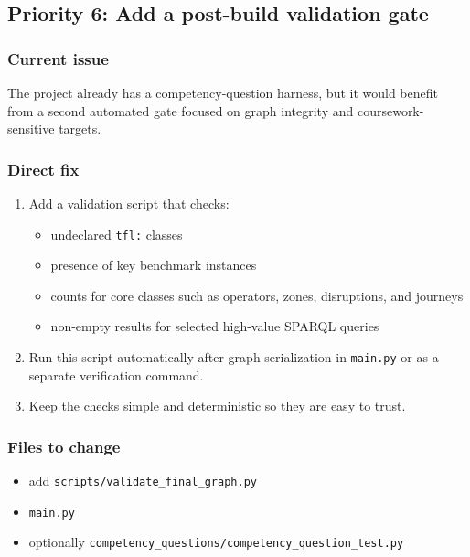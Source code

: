 \documentclass[
  11pt,
  a4paper,
]{article}
\providecommand{\tightlist}{%
  \setlength{\itemsep}{0pt}\setlength{\parskip}{0pt}}
\begin{document}
\subsection{Priority 6: Add a post-build validation
gate}\label{priority-6-add-a-post-build-validation-gate}

\subsubsection{Current issue}\label{current-issue-5}

The project already has a competency-question harness, but it would
benefit from a second automated gate focused on graph integrity and
coursework-sensitive targets.

\subsubsection{Direct fix}\label{direct-fix-5}

\begin{enumerate}
\def\labelenumi{\arabic{enumi}.}
\tightlist
\item
  Add a validation script that checks:

  \begin{itemize}
  \tightlist
  \item
    undeclared \texttt{tfl:} classes
  \item
    presence of key benchmark instances
  \item
    counts for core classes such as operators, zones, disruptions, and
    journeys
  \item
    non-empty results for selected high-value SPARQL queries
  \end{itemize}
\item
  Run this script automatically after graph serialization in
  \texttt{main.py} or as a separate verification command.
\item
  Keep the checks simple and deterministic so they are easy to trust.
\end{enumerate}

\subsubsection{Files to change}\label{files-to-change-5}

\begin{itemize}
\tightlist
\item
  add \texttt{scripts/validate\_final\_graph.py}
\item
  \texttt{main.py}
\item
  optionally
  \texttt{competency\_questions/competency\_question\_test.py}
\end{itemize}
\end{document}
